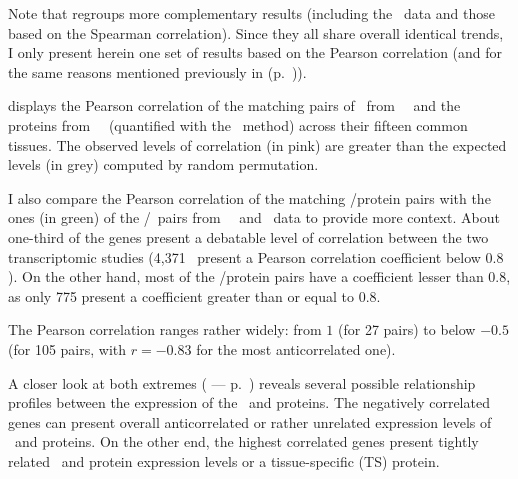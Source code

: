 Note that  regroups more complementary results
(including the \gtex\ data and those based on the Spearman correlation).
Since they all share overall identical trends,
I only present herein one set of results based on the Pearson correlation
(and for the same reasons mentioned previously in 
(p.~\pageref{seg:pearOverSpear})).

 displays the Pearson correlation
of the matching pairs of \mRNAs\ from \uhlen\ \etal\
and the proteins from \pandey\ \etal\ (quantified with the \PPKM\ method)
across their fifteen common tissues.
The observed levels of correlation (in pink)  are greater
than the expected levels (in grey) computed by random permutation.

I also compare the Pearson correlation of the matching \mRNAs/protein pairs
with the ones (in green) of the \mRNAs{}/\mRNAs\ pairs
from \uhlen\ \etal\ and \gtex\ data
to provide more context.
About one-third of the genes present a debatable level of correlation
between the two transcriptomic studies
(4,371 \mRNAs\ present a Pearson correlation coefficient below $0.8$).
On the other hand,
most of the \mRNA/protein pairs have a coefficient lesser than $0.8$,
as only 775 present a coefficient greater than or equal to $0.8$.

The Pearson correlation ranges rather widely:
from $1$ (for 27 pairs)
to below $-0.5$ (for 105 pairs,
with $r=-0.83$ for the  most anticorrelated one).\mybr\

A closer look at both extremes ( --- p.~\pageref{fig:caseGene})
reveals several possible relationship profiles
between the expression of the \mRNAs\ and proteins.
The negatively correlated genes can present
overall anticorrelated or rather unrelated expression levels
of \mRNAs\ and proteins.
On the other end,
the highest correlated genes present
tightly related \mRNA\ and protein expression levels
or a tissue-specific (\gls{TS}) protein.

